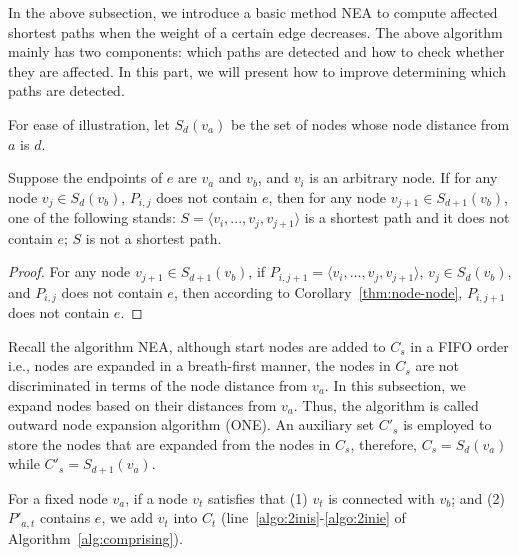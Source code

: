 In the above subsection, we introduce a basic method NEA to compute affected shortest paths when the weight of a certain edge decreases.
The above algorithm mainly has two components: which paths are detected and how to check whether they are affected.
In this part, we will present how to improve determining which paths are detected.

For ease of illustration, let $S_d(v_a)$ be the set of nodes whose node distance from $a$ is $d$.

\begin{corollary}
\label{thm:reduce-end-node}
Suppose the endpoints of $e$ are $v_a$ and $v_b$, and $v_i$ is an arbitrary node. If for any node $v_j \in S_d(v_b)$, $P_{i,j}$ does not contain $e$, then for any node $v_{j+1}\in S_{d+1}(v_b)$, one of the following stands: $S=\langle v_i,...,v_j,v_{j+1}\rangle$ is a shortest path and it does not contain $e$; $S$ is not a shortest path.
\end{corollary}
\begin{proof}
For any node $v_{j+1}\in S_{d+1}(v_b)$, if $P_{i,j+1}=\langle v_i,...,v_j,v_{j+1}\rangle$, $v_j\in S_d(v_b)$, and $P_{i,j}$ does not contain $e$, then according to Corollary~\ref{thm:node-node}, $P_{i,j+1}$ does not contain $e$.
\end{proof}

Recall the algorithm NEA, although start nodes are added to $C_s$ in a FIFO order i.e., nodes are expanded in a breath-first manner, the nodes in $C_s$ are not discriminated in terms of the node distance from $v_a$.
In this subsection, we expand nodes based on their distances from $v_a$. Thus, the algorithm is called outward node expansion algorithm (ONE).
An auxiliary set $C'_s$ is employed to store the nodes that are expanded from the nodes in $C_s$, therefore, $C_s=S_{d}(v_a)$ while $C'_s=S_{d+1}(v_a)$.

For a fixed node $v_a$, if a node $v_t$ satisfies that (1) $v_t$ is connected with $v_b$; and (2) $P'_{a,t}$ contains $e$, we add $v_t$ into $C_t$ (line~\ref{algo:2inis}-\ref{algo:2inie} of Algorithm~\ref{alg:comprising}).

